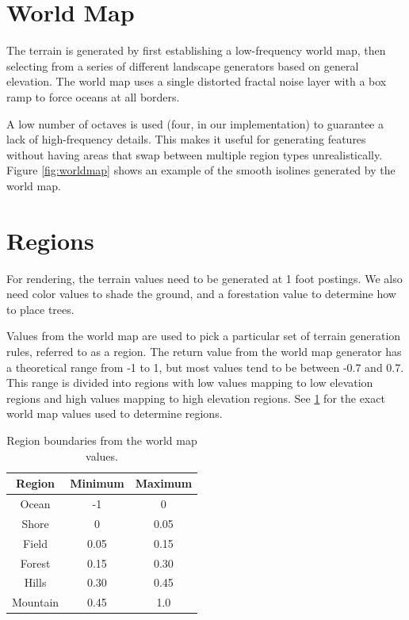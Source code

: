\section{World Map} \label{sec:worldmap}

The terrain is generated by first establishing a low-frequency world map, then selecting from a series of different landscape generators based on general elevation.
The world map uses a single distorted fractal noise layer with a box ramp to force oceans at all borders.

A low number of octaves is used (four, in our implementation) to guarantee a lack of high-frequency details.
This makes it useful for generating features without having areas that swap between multiple region types unrealistically.
Figure \ref{fig:worldmap} shows an example of the smooth isolines generated by the world map.

\section{Regions} \label{sec:region}

For rendering, the terrain values need to be generated at 1 foot postings.
We also need color values to shade the ground, and a forestation value to determine how to place trees.

Values from the world map are used to pick a particular set of terrain generation rules, referred to as a region.
The return value from the world map generator has a theoretical range from -1 to 1, but most values tend to be between -0.7 and 0.7.
This range is divided into regions with low values mapping to low elevation regions and high values mapping to high elevation regions.
See \ref{tab:regions} for the exact world map values used to determine regions.

\begin{table}
	\centering
	\begin{tabular}{ || c | c | c || }
		\hline
		Region & Minimum & Maximum \\ [0.5ex]
		\hline\hline
		Ocean & -1 & 0 \\
		\hline
		Shore & 0 & 0.05 \\
		\hline
		Field & 0.05 & 0.15 \\
		\hline
		Forest & 0.15 & 0.30 \\
		\hline
		Hills & 0.30 & 0.45 \\
		\hline
		Mountain & 0.45 & 1.0 \\ [1ex]
		\hline
	\end{tabular}
	\caption{Region boundaries from the world map values.}
	\label{tab:regions}
\end{table}

